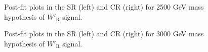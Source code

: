 \begin{figure}[H]
  \centering
  \caption{Post-fit plots in the SR (left) and CR (right) for 2500 GeV mass hypothesis of $W'_{\text{R}}$ signal.}
  \label{fig:Postfit_WpRH2500_Asimov}
\end{figure}
\begin{figure}[H]
  \centering
  \caption{Post-fit plots in the SR (left) and CR (right) for 3000 GeV mass hypothesis of $W'_{\text{R}}$ signal.}
  \label{fig:Postfit_WpRH3000_Asimov}
\end{figure}
